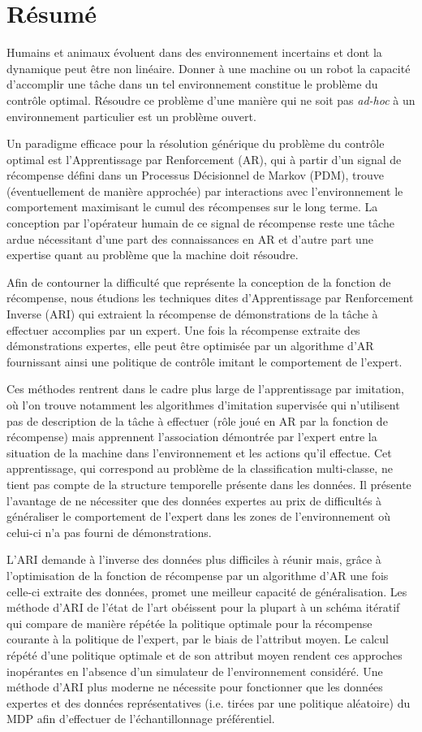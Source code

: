 \documentclass[11pt]{article}
\begin{document}
\section*{Résumé}
Humains et animaux évoluent dans des environnement incertains et dont la dynamique peut être non linéaire. Donner à une machine ou un robot la capacité d'accomplir une tâche dans un tel environnement constitue le problème du contrôle optimal. Résoudre ce problème d'une manière qui ne soit pas \emph{ad-hoc} à un environnement particulier est un problème ouvert.

Un paradigme efficace pour la résolution générique du problème du contrôle optimal est l'Apprentissage par Renforcement (AR), qui à partir d'un signal de récompense défini dans un Processus Décisionnel de Markov (PDM), trouve (éventuellement de manière approchée) par interactions avec l'environnement le comportement maximisant le cumul des récompenses sur le long terme. La conception par l'opérateur humain de ce signal de récompense reste une tâche ardue nécessitant d'une part des connaissances en AR et d'autre part une expertise quant au problème que la machine doit résoudre.

Afin de contourner la difficulté que représente la conception de la fonction de récompense, nous étudions les techniques dites d'Apprentissage par Renforcement Inverse (ARI) qui extraient la récompense de démonstrations de la tâche à effectuer accomplies par un expert. Une fois la récompense extraite des démonstrations expertes, elle peut être optimisée par un algorithme d'AR fournissant ainsi une politique de contrôle imitant le comportement de l'expert.

Ces méthodes rentrent dans le cadre plus large de l'apprentissage par imitation, où l'on trouve notamment les algorithmes d'imitation supervisée qui n'utilisent pas de description de la tâche à effectuer (rôle joué en AR par la fonction de récompense) mais apprennent l'association démontrée par l'expert entre la situation de la machine dans l'environnement et les actions qu'il effectue. Cet apprentissage, qui correspond au problème de la classification multi-classe, ne tient pas compte de la structure temporelle présente dans les données. Il présente l'avantage de ne nécessiter que des données expertes au prix de difficultés à généraliser le comportement de l'expert dans les zones de l'environnement où celui-ci n'a pas fourni de démonstrations.

L'ARI demande à l'inverse des données plus difficiles à réunir mais, grâce à l'optimisation de la fonction de récompense par un algorithme d'AR une fois celle-ci extraite des données, promet une meilleur capacité de généralisation. Les méthode d'ARI de l'état de l'art obéissent pour la plupart à un schéma itératif qui compare de manière répétée la politique optimale pour la récompense courante à la politique de l'expert, par le biais de l'attribut moyen. Le calcul répété d'une politique optimale et de son attribut moyen rendent ces approches inopérantes en l'absence d'un simulateur de l'environnement considéré. Une méthode d'ARI plus moderne ne nécessite pour fonctionner que les données expertes et des données représentatives (i.e. tirées par une politique aléatoire) du MDP afin d'effectuer de l'échantillonnage préférentiel.
\end{document}
